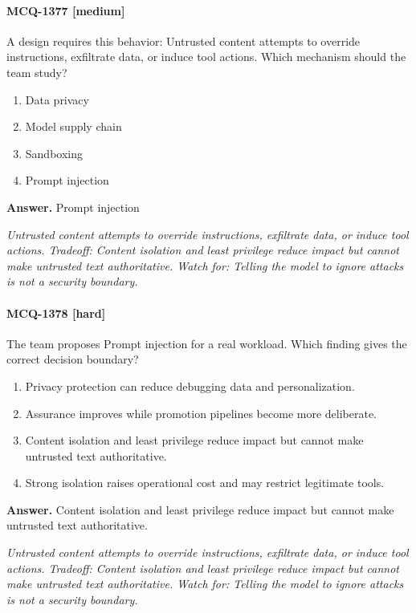 \paragraph{MCQ-1377 [medium]} A design requires this behavior: Untrusted content attempts to override instructions, exfiltrate data, or induce tool actions. Which mechanism should the team study?
\begin{enumerate}[label=\Alph*.]
\item Data privacy
\item Model supply chain
\item Sandboxing
\item Prompt injection
\end{enumerate}
\noindent\textbf{Answer.} Prompt injection
\par\textit{Untrusted content attempts to override instructions, exfiltrate data, or induce tool actions. Tradeoff: Content isolation and least privilege reduce impact but cannot make untrusted text authoritative. Watch for: Telling the model to ignore attacks is not a security boundary.}
\paragraph{MCQ-1378 [hard]} The team proposes Prompt injection for a real workload. Which finding gives the correct decision boundary?
\begin{enumerate}[label=\Alph*.]
\item Privacy protection can reduce debugging data and personalization.
\item Assurance improves while promotion pipelines become more deliberate.
\item Content isolation and least privilege reduce impact but cannot make untrusted text authoritative.
\item Strong isolation raises operational cost and may restrict legitimate tools.
\end{enumerate}
\noindent\textbf{Answer.} Content isolation and least privilege reduce impact but cannot make untrusted text authoritative.
\par\textit{Untrusted content attempts to override instructions, exfiltrate data, or induce tool actions. Tradeoff: Content isolation and least privilege reduce impact but cannot make untrusted text authoritative. Watch for: Telling the model to ignore attacks is not a security boundary.}
